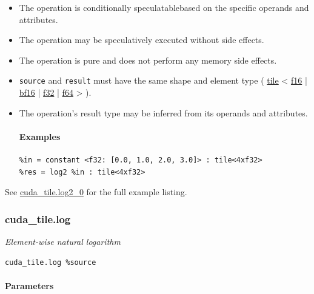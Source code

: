 \documentclass{article}
\begin{document}
\begin{itemize}
\item The operation is conditionally speculatablebased on the specific operands and attributes.
\item The operation may be speculatively executed without side effects.
\item The operation is pure and does not perform any memory side effects.
\item \texttt{source} and \texttt{result} must have the same shape and element type ( \href{https://docs.nvidia.com/cuda/tile-ir/latest/sections/types.html#type-tile}{tile} < \href{https://docs.nvidia.com/cuda/tile-ir/latest/sections/types.html#subsection-element-types}{f16} | \href{https://docs.nvidia.com/cuda/tile-ir/latest/sections/types.html#subsection-element-types}{bf16} | \href{https://docs.nvidia.com/cuda/tile-ir/latest/sections/types.html#subsection-element-types}{f32} | \href{https://docs.nvidia.com/cuda/tile-ir/latest/sections/types.html#subsection-element-types}{f64} > ).
\item The operation's result type may be inferred from its operands and attributes.


\paragraph{Examples}

\begin{lstlisting}
%in = constant <f32: [0.0, 1.0, 2.0, 3.0]> : tile<4xf32>
%res = log2 %in : tile<4xf32>
\end{lstlisting}

\end{itemize}
See \href{https://docs.nvidia.com/cuda/tile-ir/latest/sections/appendix.html#example-cuda-tile-log2-0}{cuda\_tile.log2\_0} for the full example listing.



\subsubsection{cuda\_tile.log}

\textit{Element-wise natural logarithm}


\begin{lstlisting}
cuda_tile.log %source
\end{lstlisting}

\paragraph{Parameters}
\end{document}
